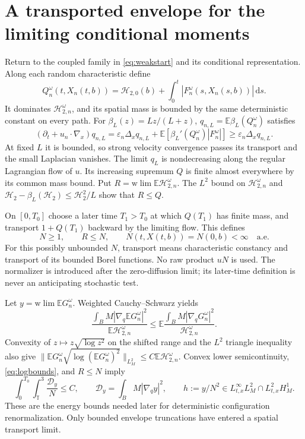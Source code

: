 \documentclass[11pt]{article}
\numberwithin{equation}{section}
\newcommand{\T}{\mathbb T^3}
\newcommand{\E}{\mathbb E}
\newcommand{\dd}{\,\mathrm d}
\newcommand{\grad}{\nabla}
\newcommand{\Htwo}{\mathcal H_2}
\newcommand{\Dy}{\mathcal D_y}
\begin{document}
\section{A transported envelope for the limiting conditional moments}\label{sec:envelope}
Return to the coupled family in \eqref{eq:weakstart} and its conditional
representation. Along each random characteristic define
\begin{equation}\label{eq:Q}
 Q_n^\omega(t,X_n(t,b))=\mathcal H_{2,0}(b)+
                \int_0^t|F_n^\omega(s,X_n(s,b))|\dd s.
\end{equation}
It dominates $\mathcal H_{2,n}^\omega$, and its spatial mass is bounded by the same
deterministic constant on every path. For $\beta_L(z)=Lz/(L+z)$,
$q_{n,L}=\E\beta_L(Q_n^\omega)$ satisfies
\begin{equation}\label{eq:boundedQ}
 (\partial_t+u_n\cdot\grad_x)q_{n,L}
 =\varepsilon_n\Delta_xq_{n,L}
   +\E[\beta_L'(Q_n^\omega)|F_n^\omega|]\geq
      \varepsilon_n\Delta_xq_{n,L}.
\end{equation}
At fixed $L$ it is bounded, so strong velocity convergence passes its
transport and the small Laplacian vanishes. The limit $q_L$ is nondecreasing
along the regular Lagrangian flow of $u$. Its increasing supremum $Q$ is
finite almost everywhere by its common mass bound. Put
$R=\mathrm{w}\!\lim\E\mathcal H_{2,n}^\omega$. The $L^2$ bound on $\mathcal H_{2,n}^\omega$
and $\Htwo-\beta_L(\Htwo)\leq\Htwo^2/L$ show that $R\leq Q$.

On $[0,T_0]$ choose a later time $T_1>T_0$ at which $Q(T_1)$ has finite
mass, and transport $1+Q(T_1)$ backward by the limiting flow. This defines
\begin{equation}\label{eq:N}
 N\geq1,\qquad R\leq N,
 \qquad N(t,X(t,b))=N(0,b)<\infty\quad\text{a.e.}
\end{equation}
For this possibly unbounded $N$, transport means characteristic constancy
and transport of its bounded Borel functions. No raw product $uN$ is used.
The normalizer is introduced after the zero-diffusion limit; its later-time
definition is never an anticipating stochastic test.

Let $y=\mathrm{w}\!\lim\E G_n^\omega$. Weighted Cauchy--Schwarz yields
\[
 \frac{\int_BM|\grad_q\E G_n^\omega|^2}{\E\mathcal H_{2,n}^\omega}
 \leq\E\frac{\int_BM|\grad_qG_n^\omega|^2}{\mathcal H_{2,n}^\omega}.
\]
Convexity of $z\mapsto z\sqrt{\log z^2}$ on the shifted range and the $L^2$
triangle inequality also give
$\|\E G_n^\omega\sqrt{\log(\E G_n^\omega)^2}\|_{L^2_M}
 \leq C\E\mathcal H_{2,n}^\omega$.
Convex lower semicontinuity, \eqref{eq:logbounds}, and $R\leq N$ imply
\begin{equation}\label{eq:yenergy}
 \int_0^{T_0}\int_\T\frac{\Dy}{N}\leq C,
 \qquad \Dy=\int_BM|\grad_qy|^2,\qquad
 h:=y/N^2\in L^\infty_{t,x}L^2_M\cap L^2_{t,x}H^1_M.
\end{equation}
These are the energy bounds needed later for deterministic configuration
renormalization. Only bounded envelope truncations have entered a spatial
transport limit.
\end{document}
